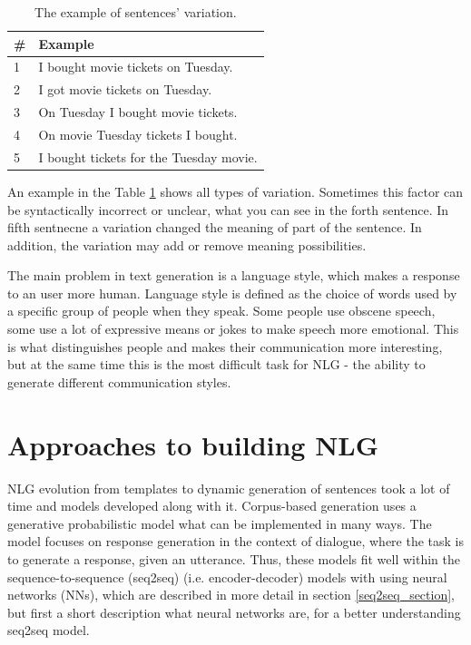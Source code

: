 \begin{table}[ht]
\centering
 \begin{tabular}{|p{0.5cm}|p{8cm}|} 
 \hline
 \# & Example \\
 \hline
 1 & I bought movie tickets on Tuesday. \\ 
 \hline
 2 & I got movie tickets on Tuesday. \\
 \hline
 3 & On Tuesday I bought movie tickets. \\
 \hline
 4 & On movie Tuesday tickets I bought. \\
 \hline
 5 & I bought tickets for the Tuesday movie. \\ 
 \hline
 \end{tabular}
 \caption{The example of sentences' variation.}
\label{tab:var_example}
\end{table}

An example in the Table \ref{tab:var_example} shows all types of variation. Sometimes this factor can be syntactically incorrect or unclear, what you can see in the forth sentence. In fifth sentnecne a variation changed the meaning of part of the sentence. In addition, the variation may add or remove meaning possibilities.


The main problem in text generation is a language style, which makes a response to an user more human. Language style is defined as the choice of words used by a specific group of people when they speak. Some people use obscene speech, some use a lot of expressive means or jokes to make speech more emotional. This is what distinguishes people and makes their communication more interesting, but at the same time this is the most difficult task for NLG - the ability to generate different communication styles.

\chapter{Approaches to building NLG}
NLG evolution from templates to dynamic generation of sentences took a lot of time and models developed along with it. Corpus-based generation uses a generative probabilistic model what can be implemented in many ways. The model focuses on response generation in the context of dialogue, where the task is to generate a response, given an utterance. Thus, these models fit well within the sequence-to-sequence (seq2seq) (i.e. encoder-decoder) models with using neural networks (NNs), which are described in more detail in section \ref{seq2seq_section}, but first a short description what neural networks are, for a better understanding seq2seq model.

